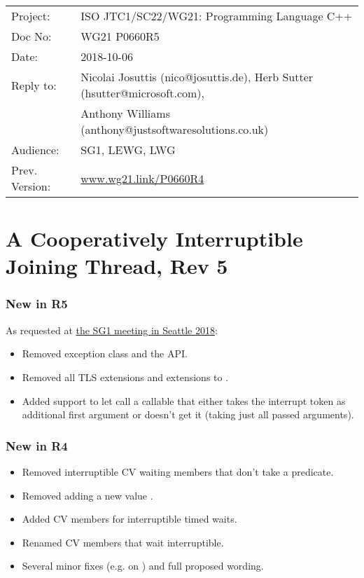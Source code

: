 
{\small
\begin{tabular}{@{}ll}
Project:  	& ISO JTC1/SC22/WG21: Programming Language C++ \\
Doc No: 	& WG21 P0660R5 \\
Date: 		& 2018-10-06 \\
Reply to: 	& Nicolai Josuttis (nico@josuttis.de), Herb Sutter (hsutter@microsoft.com), \\
                &         Anthony Williams (anthony@justsoftwaresolutions.co.uk) \\
Audience: 	& SG1, LEWG, LWG \\
Prev. Version:	& \url{www.wg21.link/P0660R4} \\
\end{tabular}
}

\section*{{\huge{}A Cooperatively Interruptible Joining Thread, Rev 5}}

\subsubsection*{New in R5}
As requested at
\href{http://wiki.edg.com/bin/view/ExecSeattle2018/MinutesDay2}{the SG1 meeting in Seattle 2018}:
\begin{itemize}
 \item Removed exception class  and the  API.
 \item Removed all TLS extensions and extensions to .
 \item Added support to let  call a callable that
        either takes the interrupt token as additional first argument
        or doesn't get it (taking just all passed arguments).
\end{itemize}

\subsubsection*{New in R4}
\begin{itemize}
 \item Removed interruptible CV waiting members that don't take a predicate.
 \item Removed adding a new  value .
 \item Added CV members for interruptible timed waits.
 \item Renamed CV members that wait interruptible.
 \item Several minor fixes (e.g. on ) and full proposed wording.
\end{itemize}

